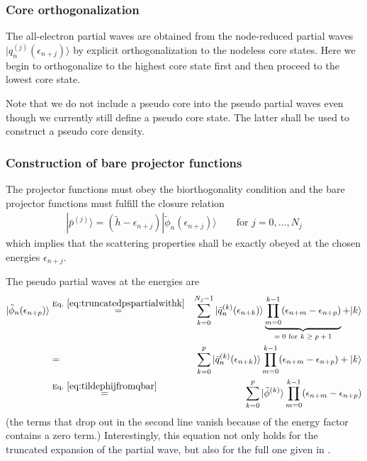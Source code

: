 \documentclass[11pt,a4paper]{report}
\begin{document}
\subsubsection{Core orthogonalization}
The all-electron partial waves are obtained from the node-reduced
partial waves $|q_n^{(j)}(\epsilon_{n+j})\rangle$ by explicit
orthogonalization to the nodeless core states. Here we begin to
orthogonalize to the highest core state first and then proceed to the
lowest core state.

Note that we do not include a pseudo core into the pseudo partial
waves even though we currently still define a pseudo core state. The
latter shall be used to construct a pseudo core density.

\subsubsection{Construction of bare projector functions}
The projector functions must obey the biorthogonality condition and
the bare projector functions must fulfill the closure relation
\begin{eqnarray}
|\bar{p}^{(j)}\rangle=(\tilde{h}-\epsilon_{n+j})
|\tilde{\phi}_n(\epsilon_{n+j})\rangle \qquad\text{for $j=0,\ldots,N_j$}
\end{eqnarray}
which implies that the scattering properties shall be exactly obeyed at
the chosen energies $\epsilon_{n+j}$.

The pseudo partial waves at the energies are
\begin{eqnarray}
|\tilde{\phi}_n(\epsilon_{n+p})\rangle
&\eqrel{eq:truncatedpspartialwithk}{=}&
\sum_{k=0}^{N_j-1}|\bar{q}_n^{(k)}(\epsilon_{n+k})\rangle
\underbrace{\prod_{m=0}^{k-1}(\epsilon_{n+m}-\epsilon_{n+p})}
_{\text{$=0$ for $k\ge p+1$}}+|k\rangle
\nonumber\\
&=&\sum_{k=0}^{p}|\bar{q}_n^{(k)}(\epsilon_{n+k})\rangle
\prod_{m=0}^{k-1}(\epsilon_{n+m}-\epsilon_{n+p})+|k\rangle
\nonumber\\
&\eqrel{eq:tildephijfromqbar}{=}&\sum_{k=0}^{p}|\tilde{\phi}^{(k)}\rangle
\prod_{m=0}^{k-1}(\epsilon_{n+m}-\epsilon_{n+p})
\label{eq:tildepsienplusp}
\end{eqnarray}
(the terms that drop out in the second line vanish because of the
energy factor contains a zero term.) Interestingly, this equation not
only holds for the truncated expansion of the partial wave, but also
for the full one given in .
\end{document}
